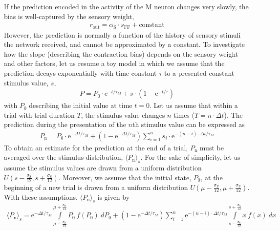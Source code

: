 \documentclass[10pt,a4paper,draft]{article}
\begin{document}
If the prediction encoded in the activity of the M neuron changes very slowly, the bias is well-captured by the sensory weight, 
%
 \begin{align}
 r_\mathrm{out} = \alpha_\mathrm{S} \cdot s_\mathrm{FF} + \mathrm{constant}
 \end{align}
%
However, the prediction is normally a function of the history of sensory stimuli the network received, and cannot be approximated by a constant. To investigate how the slope (describing the contraction bias) depends on the sensory weight and other factors, let us resume a toy model in which we assume that the prediction decays exponentially with time constant $\tau$ to a presented constant stimulus value, $s$,
%
\begin{align}
P = P_\mathrm{0} \cdot \mathrm{e}^{-t/\tau_M} +  s \cdot \left( 1 -   \mathrm{e}^{-t/\tau} \right)
\end{align}
%
with $P_0$ describing the initial value at time $t=0$. Let us assume that within a trial with trial duration $T$, the stimulus value changes $n$ times ($T = n\cdot \Delta t$).  The prediction during the presentation of the $n$th stimulus value can be expressed as
%
\begin{align}
P_\mathrm{n} = P_\mathrm{0} \cdot \mathrm{e}^{-\Delta t/\tau_M}  + \left( 1 -   \mathrm{e}^{-\Delta t/\tau_M} \right) \sum_{i=1}^{n} s_i \cdot \mathrm{e}^{-(n-i)\cdot \Delta t/ \tau_M}
\end{align}
%
To obtain an estimate for the prediction at the end of a trial, $P_\mathrm{n}$ must be averaged over the stimulus distribution, $\langle P_\mathrm{n} \rangle_s$. For the sake of simplicity, let us assume the stimulus values are drawn from a uniform distribution $U\left( s - \frac{\sigma_\mathrm{S}}{12}, s + \frac{\sigma_\mathrm{S}}{12} \right)$. Moreover, we assume that the initial state, $P_0$, at the beginning of a new trial is drawn from a uniform distribution $U\left( \mu - \frac{\sigma_\mathrm{P}}{12}, \mu + \frac{\sigma_\mathrm{P}}{12} \right)$. With these assumptions, $\langle P_\mathrm{n} \rangle_s$ is given by
%
\begin{align}
\langle P_\mathrm{n} \rangle_s = \mathrm{e}^{-\Delta t/\tau_M}  \int\limits_{\mu - \frac{\sigma_\mathrm{P}}{12}}^{\mu + \frac{\sigma_\mathrm{P}}{12}} P_\mathrm{0} \ f(P_\mathrm{0})\ dP_0+ \left( 1 -   \mathrm{e}^{-\Delta t/\tau_M} \right) \sum_{i=1}^{n} \mathrm{e}^{-(n-i)\cdot \Delta t/ \tau_M} \int\limits_{s - \frac{\sigma_\mathrm{S}}{12}}^{s + \frac{\sigma_\mathrm{S}}{12}} x\ f(x)\ dx
\end{align}
\end{document}
